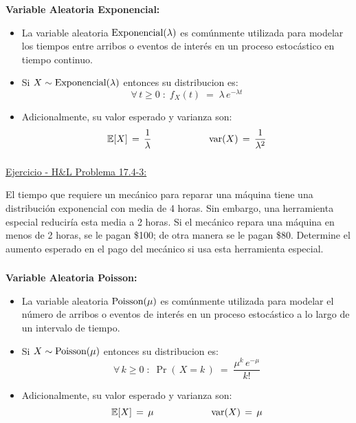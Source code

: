 \documentclass[ 10pt, xcolor = dvipsnames]{beamer}
\begin{document}
\begin{frame}[allowframebreaks]
\frametitle{\insertsection}

\textbf{Variable Aleatoria Exponencial:}
\begin{itemize}
\item La variable aleatoria $\text{Exponencial}(\lambda)$ es com\'unmente utilizada para modelar los tiempos entre arribos o eventos de inter\'es en un proceso estoc\'astico en tiempo continuo. 
\item Si $X \sim \text{Exponencial}(\lambda)$ entonces su distribucion es: 
\[
\forall \, t \geq 0 \; \colon \;
f_X(t) \; = \; \lambda \, e^{ -\lambda t}
\]
\item Adicionalmente, su valor esperado y varianza son: 
\[
\mathbb{E}[X] \, = \, \frac{1}{\lambda} \qquad \qquad \qquad
\text{var}(X) \, = \, \frac{1}{\lambda^2}
\]
\end{itemize}

\end{frame}

\begin{frame}[allowframebreaks]
\frametitle{\insertsection}

\underline{Ejercicio - H\&L Problema 17.4-3:}

El tiempo que requiere un mec\'anico para reparar una m\'aquina tiene una distribuci\'on exponencial con media de 4 horas. Sin embargo, una herramienta especial reducir\'ia esta media a 2 horas. Si el mec\'anico repara una m\'aquina en menos de 2 horas, se le pagan
\$100; de otra manera se le pagan \$80. Determine el aumento esperado en el pago del mec\'anico si usa esta herramienta especial. 

\end{frame}

\begin{frame}[allowframebreaks]
\frametitle{\insertsection}

\textbf{Variable Aleatoria Poisson:}
\begin{itemize}
\item La variable aleatoria $\text{Poisson}(\mu)$ es com\'unmente utilizada para modelar el n\'umero de arribos o eventos de inter\'es en un proceso estoc\'astico a lo largo de un intervalo de tiempo. 
\item Si $X \sim \text{Poisson}(\mu)$ entonces su distribucion es: 
\[
\forall \, k \geq 0 \; \colon \;
\Pr( \, X = k \, ) \; = \; \frac{\mu^k \, e^{-\mu} }{k!}
\]
\item Adicionalmente, su valor esperado y varianza son: 
\[
\mathbb{E}[X] \, = \, \mu \qquad \qquad \qquad
\text{var}(X) \, = \, \mu
\]
\end{itemize}

\end{frame}
\end{document}
